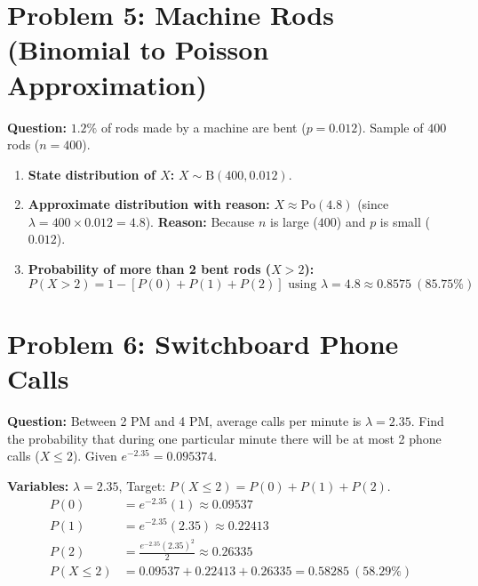 \documentclass[11pt,a4paper]{article}
\begin{document}
\section*{Problem 5: Machine Rods (Binomial to Poisson Approximation)}
\textbf{Question:} $1.2\%$ of rods made by a machine are bent ($p = 0.012$). Sample of $400$ rods ($n = 400$).
\begin{enumerate}
    \item[\textbf{(i)}] \textbf{State distribution of $X$:} $X \sim \text{B}(400, 0.012)$.
    \item[\textbf{(ii)}] \textbf{Approximate distribution with reason:} $X \approx \text{Po}(4.8)$ (since $\lambda = 400 \times 0.012 = 4.8$). \textbf{Reason:} Because $n$ is large ($400$) and $p$ is small ($0.012$).
    \item[\textbf{(iii)}] \textbf{Probability of more than 2 bent rods ($X > 2$):}
    $$P(X > 2) = 1 - [P(0) + P(1) + P(2)] \text{ using } \lambda = 4.8 \approx \mathbf{0.8575} \ (85.75\%)$$
\end{enumerate}


\section*{Problem 6: Switchboard Phone Calls}
\textbf{Question:} Between 2 PM and 4 PM, average calls per minute is $\lambda = 2.35$. Find the probability that during one particular minute there will be at most 2 phone calls ($X \le 2$). Given $e^{-2.35} = 0.095374$.

\noindent\textbf{Variables:} $\lambda = 2.35$, Target: $P(X \le 2) = P(0) + P(1) + P(2)$.
\begin{align*}
    P(0) &= e^{-2.35}(1) \approx 0.09537 \\
    P(1) &= e^{-2.35}(2.35) \approx 0.22413 \\
    P(2) &= \frac{e^{-2.35}(2.35)^2}{2} \approx 0.26335 \\
    P(X \le 2) &= 0.09537 + 0.22413 + 0.26335 = \mathbf{0.58285} \ (58.29\%)
\end{align*}
\end{document}
